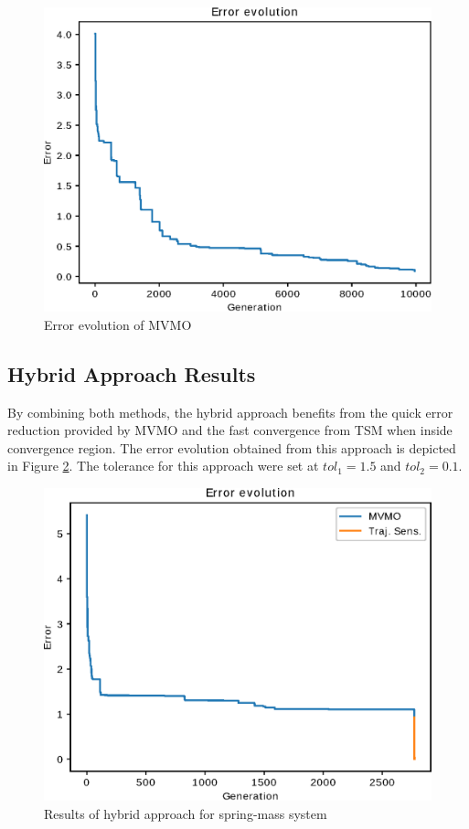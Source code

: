 \begin{figure}[h]
	\caption{Error evolution of MVMO}
	\begin{center}
		\includegraphics[scale=0.7]{Images/MVMO_conv.eps}
	\end{center}
	\label{fig: MVMO_conv}
\end{figure}

\subsection{Hybrid Approach Results}

By combining both methods, the hybrid approach benefits from the quick error reduction provided by MVMO and the fast convergence from TSM when inside convergence region. The error evolution obtained from this approach is depicted in Figure \ref{fig: Hybrid_conv}. The tolerance for this approach were set at $tol_{1} = 1.5$ and $tol_{2} = 0.1$.

\begin{figure}[h]
	\caption{Results of hybrid approach for spring-mass system}
	\begin{center}
		\includegraphics[scale=0.7]{Images/Hybrid_conv.eps}
	\end{center}
	\label{fig: Hybrid_conv}
\end{figure}

